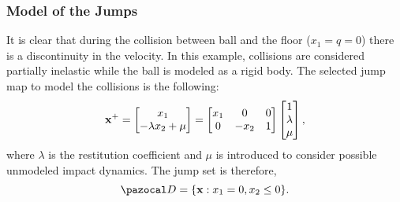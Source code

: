 \subsubsection{Model of the Jumps}
%
It is clear that during the collision between ball and the floor ($x_1 = q =0$) there is a discontinuity in the velocity. In this example, collisions are considered partially inelastic while the ball is modeled as a rigid body. The selected jump map to model the collisions is the following:
%
\begin{align}
	\mathbf{x}^+=\begin{bmatrix}x_1\\-\lambda x_2+\mu\end{bmatrix} = \begin{bmatrix}x_1&0&0\\0&-x_2&1\end{bmatrix}\begin{bmatrix}1\\\lambda\\\mu\end{bmatrix},
\end{align}
%
{where $\lambda$ is the restitution coefficient and $\mu$ is introduced to consider possible unmodeled impact dynamics}. The jump set is therefore,
%
\begin{equation}
    \D=\{\x:x_1=0,x_2\leq 0\}.
\end{equation}
%
